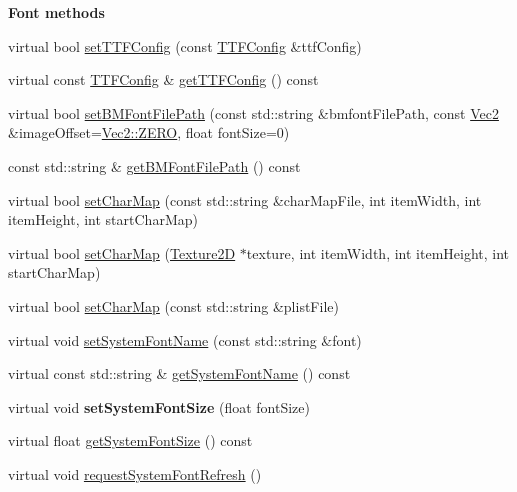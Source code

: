 \begin{Indent}\textbf{ Font methods}\par
\begin{DoxyCompactItemize}
\item 
virtual bool \hyperlink{classLabel_abb4d7ab50a3419e9a17f18074bf3c581}{set\+T\+T\+F\+Config} (const \hyperlink{structTTFConfig}{T\+T\+F\+Config} \&ttf\+Config)
\item 
virtual const \hyperlink{structTTFConfig}{T\+T\+F\+Config} \& \hyperlink{classLabel_a94ccd8344df3bf3b840f6a71f7a16d23}{get\+T\+T\+F\+Config} () const
\item 
virtual bool \hyperlink{classLabel_a70382e40203f129a1c50a0557f22ab3e}{set\+B\+M\+Font\+File\+Path} (const std\+::string \&bmfont\+File\+Path, const \hyperlink{classVec2}{Vec2} \&image\+Offset=\hyperlink{classVec2_a5c80e2e7c8bd2adcbad2844d060e6245}{Vec2\+::\+Z\+E\+RO}, float font\+Size=0)
\item 
const std\+::string \& \hyperlink{classLabel_a30dc940bd64a7b34f7facee0c9c8d2ab}{get\+B\+M\+Font\+File\+Path} () const
\item 
virtual bool \hyperlink{classLabel_af99a79db3a359039c5738ec76349ffa5}{set\+Char\+Map} (const std\+::string \&char\+Map\+File, int item\+Width, int item\+Height, int start\+Char\+Map)
\item 
virtual bool \hyperlink{classLabel_a445b80755fe7a59d8571e8ec25e2c365}{set\+Char\+Map} (\hyperlink{classTexture2D}{Texture2D} $\ast$texture, int item\+Width, int item\+Height, int start\+Char\+Map)
\item 
virtual bool \hyperlink{classLabel_a1ac1991e6d9948bae7498117acf4547f}{set\+Char\+Map} (const std\+::string \&plist\+File)
\item 
virtual void \hyperlink{classLabel_a01b4543b4786353e961a1a93599cb97e}{set\+System\+Font\+Name} (const std\+::string \&font)
\item 
virtual const std\+::string \& \hyperlink{classLabel_af88224444451a961ebf950e503e8dc29}{get\+System\+Font\+Name} () const
\item 
\mbox{\label{classLabel_a5e56ce1edb0f742b81fb40d5d92c5179}} 
virtual void {\bfseries set\+System\+Font\+Size} (float font\+Size)
\item 
virtual float \hyperlink{classLabel_a9d6aa78ef93d2903019b63d5bcd93fa1}{get\+System\+Font\+Size} () const
\item 
virtual void \hyperlink{classLabel_adf22772294ad56788486046beca0656f}{request\+System\+Font\+Refresh} ()

\end{DoxyCompactItemize}
\end{Indent}
